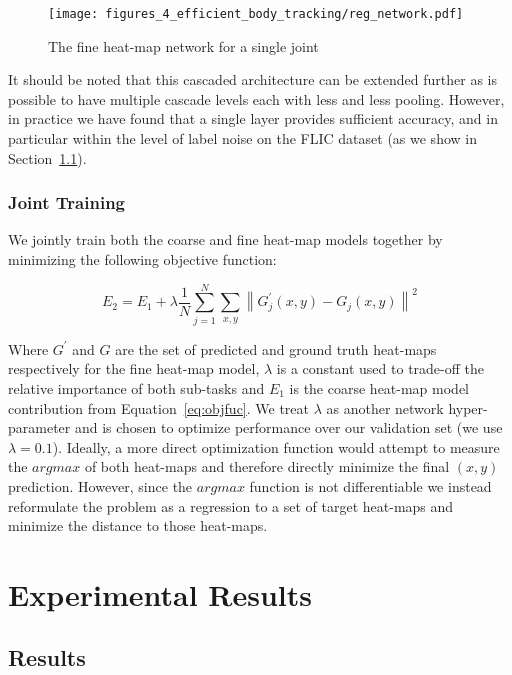 \begin{figure}[ht]
\centering
\texttt{[image: figures\_4\_efficient\_body\_tracking/reg\_network.pdf]}
   \caption{The fine heat-map network for a single joint}
\label{fig:reg_network}
\end{figure}

It should be noted that this cascaded architecture can be extended further as is possible to have multiple cascade levels each with less and less pooling. However, in practice we have found that a single layer provides sufficient accuracy, and in particular within the level of label noise on the FLIC dataset (as we show in Section~\ref{sec:results_efficient}).

\subsection{Joint Training}

We jointly train both the coarse and fine heat-map models together by minimizing the following objective function:

\begin{equation}
E_2=E_1 + \lambda\frac{1}{N}\sum_{j=1}^{N}{\sum_{x,y}{\left\|G_{j}^\prime\left(x,y\right)-G_{j}\left(x,y\right)\right\|^2}}
\end{equation}

Where $G^\prime$ and $G$ are the set of predicted and ground truth heat-maps respectively for the fine heat-map model, $\lambda$ is a constant used to trade-off the relative importance of both sub-tasks and $E_1$ is the coarse heat-map model contribution from Equation~\ref{eq:objfuc}. We treat $\lambda$ as another network hyper-parameter and is chosen to optimize performance over our validation set (we use $\lambda=0.1$). Ideally, a more direct optimization function would attempt to measure the $argmax$ of both heat-maps and therefore directly minimize the final $(x,y)$ prediction. However, since the $argmax$ function is not differentiable we instead reformulate the problem as a regression to a set of target heat-maps and minimize the distance to those heat-maps.

\chapter{Experimental Results\label{chap:4_efficient_body_tracking_experimental}}

\section{Results}
\label{sec:results_efficient}

